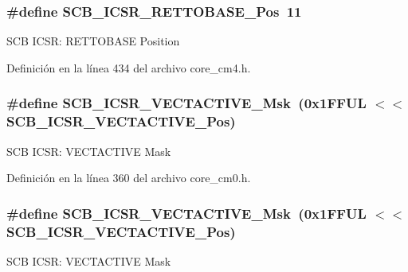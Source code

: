 \subsubsection[{\texorpdfstring{S\+C\+B\+\_\+\+I\+C\+S\+R\+\_\+\+R\+E\+T\+T\+O\+B\+A\+S\+E\+\_\+\+Pos}{SCB_ICSR_RETTOBASE_Pos}}]{\setlength{\rightskip}{0pt plus 5cm}\#define S\+C\+B\+\_\+\+I\+C\+S\+R\+\_\+\+R\+E\+T\+T\+O\+B\+A\+S\+E\+\_\+\+Pos~11}\hypertarget{group___c_m_s_i_s___s_c_b_ga403d154200242629e6d2764bfc12a7ec}{}\label{group___c_m_s_i_s___s_c_b_ga403d154200242629e6d2764bfc12a7ec}
S\+CB I\+C\+SR\+: R\+E\+T\+T\+O\+B\+A\+SE Position 

Definición en la línea 434 del archivo core\+\_\+cm4.\+h.

\subsubsection[{\texorpdfstring{S\+C\+B\+\_\+\+I\+C\+S\+R\+\_\+\+V\+E\+C\+T\+A\+C\+T\+I\+V\+E\+\_\+\+Msk}{SCB_ICSR_VECTACTIVE_Msk}}]{\setlength{\rightskip}{0pt plus 5cm}\#define S\+C\+B\+\_\+\+I\+C\+S\+R\+\_\+\+V\+E\+C\+T\+A\+C\+T\+I\+V\+E\+\_\+\+Msk~(0x1\+F\+F\+U\+L $<$$<$ S\+C\+B\+\_\+\+I\+C\+S\+R\+\_\+\+V\+E\+C\+T\+A\+C\+T\+I\+V\+E\+\_\+\+Pos)}\hypertarget{group___c_m_s_i_s___s_c_b_ga5533791a4ecf1b9301c883047b3e8396}{}\label{group___c_m_s_i_s___s_c_b_ga5533791a4ecf1b9301c883047b3e8396}
S\+CB I\+C\+SR\+: V\+E\+C\+T\+A\+C\+T\+I\+VE Mask 

Definición en la línea 360 del archivo core\+\_\+cm0.\+h.

\subsubsection[{\texorpdfstring{S\+C\+B\+\_\+\+I\+C\+S\+R\+\_\+\+V\+E\+C\+T\+A\+C\+T\+I\+V\+E\+\_\+\+Msk}{SCB_ICSR_VECTACTIVE_Msk}}]{\setlength{\rightskip}{0pt plus 5cm}\#define S\+C\+B\+\_\+\+I\+C\+S\+R\+\_\+\+V\+E\+C\+T\+A\+C\+T\+I\+V\+E\+\_\+\+Msk~(0x1\+F\+F\+U\+L $<$$<$ S\+C\+B\+\_\+\+I\+C\+S\+R\+\_\+\+V\+E\+C\+T\+A\+C\+T\+I\+V\+E\+\_\+\+Pos)}\hypertarget{group___c_m_s_i_s___s_c_b_ga5533791a4ecf1b9301c883047b3e8396}{}\label{group___c_m_s_i_s___s_c_b_ga5533791a4ecf1b9301c883047b3e8396}
S\+CB I\+C\+SR\+: V\+E\+C\+T\+A\+C\+T\+I\+VE Mask 

